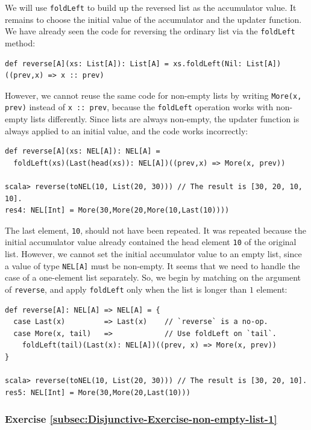 We will use \lstinline!foldLeft! to build up the reversed list as
the accumulator value. It remains to choose the initial value of the
accumulator and the updater function. We have already seen the code
for reversing the ordinary list via the \lstinline!foldLeft! method:
\begin{lstlisting}
def reverse[A](xs: List[A]): List[A] = xs.foldLeft(Nil: List[A])((prev,x) => x :: prev)
\end{lstlisting}
However, we cannot reuse the same code for non-empty lists by writing
\lstinline!More(x, prev)! instead of \lstinline!x :: prev!, because
the \lstinline!foldLeft! operation works with non-empty lists differently.
Since lists are always non-empty, the updater function is always applied
to an initial value, and the code works incorrectly:
\begin{lstlisting}
def reverse[A](xs: NEL[A]): NEL[A] =
  foldLeft(xs)(Last(head(xs)): NEL[A])((prev,x) => More(x, prev))

scala> reverse(toNEL(10, List(20, 30))) // The result is [30, 20, 10, 10].
res4: NEL[Int] = More(30,More(20,More(10,Last(10))))
\end{lstlisting}
The last element, \lstinline!10!, should not have been repeated.
It was repeated because the initial accumulator value already contained
the head element \lstinline!10! of the original list. However, we
cannot set the initial accumulator value to an empty list, since a
value of type \lstinline!NEL[A]! must be non-empty. It seems that
we need to handle the case of a one-element list separately. So, we
begin by matching on the argument of \lstinline!reverse!, and apply
\lstinline!foldLeft! only when the list is longer than $1$ element:
\begin{lstlisting}
def reverse[A]: NEL[A] => NEL[A] = {
  case Last(x)         => Last(x)    // `reverse` is a no-op.
  case More(x, tail)   =>            // Use foldLeft on `tail`.
    foldLeft(tail)(Last(x): NEL[A])((prev, x) => More(x, prev))
}

scala> reverse(toNEL(10, List(20, 30))) // The result is [30, 20, 10].
res5: NEL[Int] = More(30,More(20,Last(10)))
\end{lstlisting}


\subsubsection{Exercise \label{subsec:Disjunctive-Exercise-non-empty-list-1}\ref{subsec:Disjunctive-Exercise-non-empty-list-1}}

